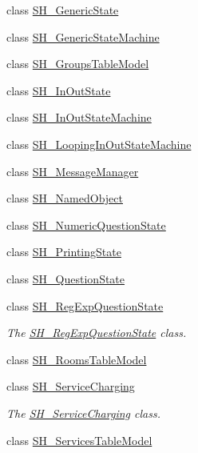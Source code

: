 \begin{DoxyCompactItemize}
class \hyperlink{classSimpleHotel_1_1SH__GenericState}{S\-H\-\_\-\-Generic\-State}
\item 
class \hyperlink{classSimpleHotel_1_1SH__GenericStateMachine}{S\-H\-\_\-\-Generic\-State\-Machine}
\item 
class \hyperlink{classSimpleHotel_1_1SH__GroupsTableModel}{S\-H\-\_\-\-Groups\-Table\-Model}
\item 
class \hyperlink{classSimpleHotel_1_1SH__InOutState}{S\-H\-\_\-\-In\-Out\-State}
\item 
class \hyperlink{classSimpleHotel_1_1SH__InOutStateMachine}{S\-H\-\_\-\-In\-Out\-State\-Machine}
\item 
class \hyperlink{classSimpleHotel_1_1SH__LoopingInOutStateMachine}{S\-H\-\_\-\-Looping\-In\-Out\-State\-Machine}
\item 
class \hyperlink{classSimpleHotel_1_1SH__MessageManager}{S\-H\-\_\-\-Message\-Manager}
\item 
class \hyperlink{classSimpleHotel_1_1SH__NamedObject}{S\-H\-\_\-\-Named\-Object}
\item 
class \hyperlink{classSimpleHotel_1_1SH__NumericQuestionState}{S\-H\-\_\-\-Numeric\-Question\-State}
\item 
class \hyperlink{classSimpleHotel_1_1SH__PrintingState}{S\-H\-\_\-\-Printing\-State}
\item 
class \hyperlink{classSimpleHotel_1_1SH__QuestionState}{S\-H\-\_\-\-Question\-State}
\item 
class \hyperlink{classSimpleHotel_1_1SH__RegExpQuestionState}{S\-H\-\_\-\-Reg\-Exp\-Question\-State}
\begin{DoxyCompactList}\small\item\em The \hyperlink{classSimpleHotel_1_1SH__RegExpQuestionState}{S\-H\-\_\-\-Reg\-Exp\-Question\-State} class. \end{DoxyCompactList}\item 
class \hyperlink{classSimpleHotel_1_1SH__RoomsTableModel}{S\-H\-\_\-\-Rooms\-Table\-Model}
\item 
class \hyperlink{classSimpleHotel_1_1SH__ServiceCharging}{S\-H\-\_\-\-Service\-Charging}
\begin{DoxyCompactList}\small\item\em The \hyperlink{classSimpleHotel_1_1SH__ServiceCharging}{S\-H\-\_\-\-Service\-Charging} class. \end{DoxyCompactList}\item 
class \hyperlink{classSimpleHotel_1_1SH__ServicesTableModel}{S\-H\-\_\-\-Services\-Table\-Model}
\item 

\end{DoxyCompactItemize}
